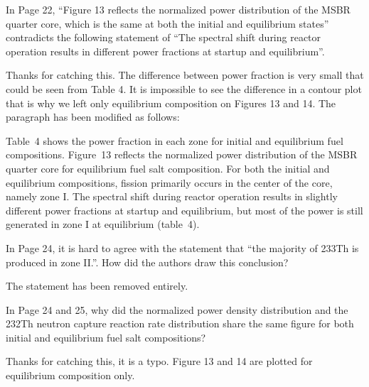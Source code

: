 \documentclass[answers,11pt]{exam}
\begin{document}
\begin{questions}
        \question  In Page 22, ``Figure 13 reflects the normalized power 
        distribution of the MSBR quarter core, which is the same at both the 
        initial and equilibrium states'' contradicts the following statement of 
        ``The spectral shift during reactor operation results in different power 
        fractions at startup and equilibrium''.
        \begin{solution}
                Thanks for catching this. The difference between power fraction
                 is very small that could be seen from Table 4. It is impossible
                  to see the difference in a contour plot that is why we left only 
                 equilibrium composition on Figures 13 and 14. The paragraph has 
                 been modified as follows:
                 
                 Table~4 shows the power fraction in each zone for initial and 
                 equilibrium fuel compositions. Figure~13 reflects the 
                 normalized power distribution of the \gls{MSBR} quarter core 
                 for equilibrium fuel salt composition. For both the initial 
                 and equilibrium compositions, fission primarily occurs in the 
                 center of the core, namely zone I. The spectral shift during 
                 reactor operation results in slightly different power 
                 fractions at startup and equilibrium, but most of the power is 
                 still generated in zone I at equilibrium (table~4).
                   
        \end{solution}

        \question  In Page 24, it is hard to agree with the statement that ``the 
        majority of 233Th is produced in zone II.''. How did the authors draw 
        this conclusion?
        \begin{solution}
                The statement has been removed entirely.
        \end{solution}

        \question  In Page 24 and 25, why did the normalized power density 
        distribution and the 232Th neutron capture reaction rate distribution 
        share the same figure for both initial and equilibrium fuel salt 
        compositions?
        \begin{solution}
                Thanks for catching this, it is a typo. Figure 13 and 14 are plotted 
                for equilibrium composition only.            	    
        \end{solution}


\end{questions}
\end{document}
